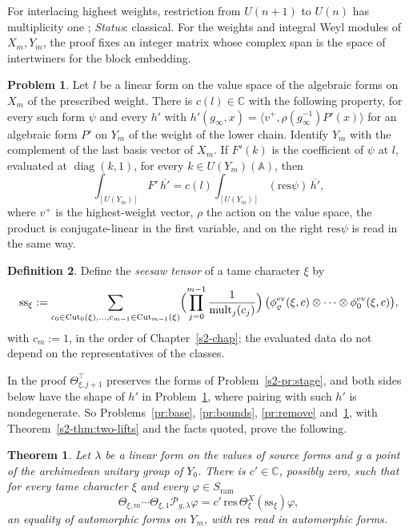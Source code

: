 \documentclass[reqno]{amsart}
\newcounter{chap}
\theoremstyle{definition}
\newtheorem{problem}{Problem}[section]
\newtheorem{definition}[problem]{Definition}
\theoremstyle{plain}
\newtheorem{theorem}{Theorem}[section]
\theoremstyle{remark}
\newcommand{\C}{\mathbb{C}}
\newcommand{\A}{\mathbb{A}}
\newcommand{\Pc}{\mathcal{P}}
\newcommand{\Cut}{\mathrm{Cut}}
\newcommand{\mult}{\mathrm{mult}}
\newcommand{\ssx}{\mathrm{ss}_\xi}
\newcommand{\ev}{\mathrm{ev}}
\newcommand{\res}{\mathrm{res}}
\newcommand{\Sr}{S_{\mathrm{ram}}}
\newcommand{\diag}{\operatorname{diag}}
\begin{document}
For interlacing highest weights, restriction from \(U(n+1)\) to \(U(n)\) has multiplicity one \cite[Thm.~8.1.1]{GW}; \emph{Status}: classical.  For the weights and integral Weyl modules of \(X_m,Y_m\), the proof fixes an integer matrix whose complex span is the space of intertwiners for the block embedding.

\begin{problem}\label{pr:top}
Let \(l\) be a linear form on the value space of the algebraic forms on \(X_m\) of the prescribed weight.  There is \(c(l)\in\C\) with the following property, for every such form \(\psi\) and every \(h'\) with \(h'(g_\infty,x)=\langle v^+,\rho(g_\infty^{-1})P'(x)\rangle\) for an algebraic form \(P'\) on \(Y_m\) of the weight of the lower chain.  Identify \(Y_m\) with the complement of the last basis vector of \(X_m\).  If \(F'(k)\) is the coefficient of \(\psi\) at \(l\), evaluated at \(\diag(k,1)\), for every \(k\in U(Y_m)(\A)\), then
\[
  \int_{[U(Y_m)]}F'\,\overline{h'}=c(l)\int_{[U(Y_m)]}(\res\psi)\,\overline{h'} ,
\]
where \(v^+\) is the highest-weight vector, \(\rho\) the action on the value space, the product is conjugate-linear in the first variable, and on the right \(\res\psi\) is read in the same way.
\end{problem}

\begin{definition}\label{def:ss}
Define the \emph{seesaw tensor} of a tame character \(\xi\) by
\[
  \ssx:=\sum_{c_0\in\Cut_0(\xi),\dots,c_{m-1}\in\Cut_{m-1}(\xi)}\Bigl(\prod_{j=0}^{m-1}\frac1{\mult_j(c_j)}\Bigr)\,\bigl(\phi^{\ev}_\varrho(\xi,c)\otimes\dots\otimes\phi^{\ev}_0(\xi,c)\bigr),
\]
with \(c_m:=1\), in the order of Chapter~\ref{s2-chap}; the evaluated data do not depend on the representatives of the classes.
\end{definition}

In the proof \(\Theta^\top_{\xi,j+1}\) preserves the forms of Problem~\ref{s2-pr:stage}, and both sides below have the shape of \(h'\) in Problem~\ref{pr:top}, where pairing with such \(h'\) is nondegenerate.  So Problems~\ref{pr:base}, \ref{pr:bounds}, \ref{pr:remove} and~\ref{pr:top}, with Theorem~\ref{s2-thm:two-lifts} and the facts quoted, prove the following.

\begin{theorem}\label{thm:proportional}
Let \(\lambda\) be a linear form on the values of source forms and \(g\) a point of the archimedean unitary group of \(Y_0\).  There is \(c'\in\C\), possibly zero, such that for every tame character \(\xi\) and every \(\varphi\in\Sr\)
\[
  \Theta_{\xi,m}\cdots\Theta_{\xi,1}\Pc_{g,\lambda}\varphi=c'\,\res\,\Theta^X_\xi(\ssx)\varphi ,
\]
an equality of automorphic forms on \(Y_m\), with \(\res\) read in automorphic forms.
\end{theorem}
\end{document}

